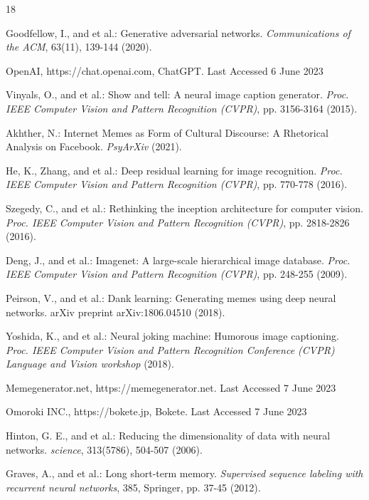 \documentclass[runningheads]{llncs}
\begin{document}
\begin{thebibliography}{18}

Goodfellow, I., and et al.: Generative adversarial networks. {\it Communications of the ACM}, 63(11), 139-144 (2020).

OpenAI, https://chat.openai.com, ChatGPT. Last Accessed 6 June 2023

Vinyals, O., and et al.: Show and tell: A neural image caption generator. {\it Proc. IEEE Computer Vision and Pattern Recognition (CVPR)}, pp. 3156-3164 (2015).

Akhther, N.: Internet Memes as Form of Cultural Discourse: A Rhetorical Analysis on Facebook. {\it PsyArXiv} (2021).

He, K., Zhang, and et al.: Deep residual learning for image recognition. {\it Proc. IEEE Computer Vision and Pattern Recognition (CVPR)}, pp. 770-778 (2016).

Szegedy, C., and et al.: Rethinking the inception architecture for computer vision. {\it Proc. IEEE Computer Vision and Pattern Recognition (CVPR)}, pp. 2818-2826 (2016).

Deng, J., and et al.: Imagenet: A large-scale hierarchical image database. {\it Proc. IEEE Computer Vision and Pattern Recognition (CVPR)}, pp. 248-255 (2009).

Peirson, V., and et al.: Dank learning: Generating memes using deep neural networks. arXiv preprint arXiv:1806.04510 (2018).

Yoshida, K., and et al.: Neural joking machine: Humorous image captioning. {\it Proc. IEEE Computer Vision and Pattern Recognition Conference (CVPR) Language and Vision workshop} (2018).

Memegenerator.net, https://memegenerator.net. Last Accessed 7 June 2023

Omoroki INC., https://bokete.jp, Bokete. Last Accessed 7 June 2023

Hinton, G. E., and et al.: Reducing the dimensionality of data with neural networks. {\it science}, 313(5786), 504-507 (2006).

Graves, A., and et al.: Long short-term memory. {\it Supervised sequence labeling with recurrent neural networks}, 385, Springer, pp. 37-45 (2012).


\end{thebibliography}
\end{document}
